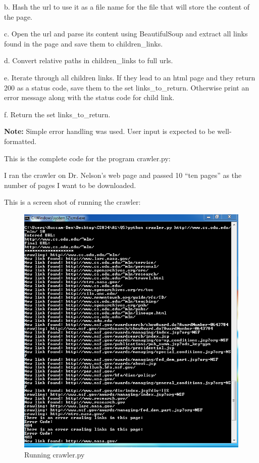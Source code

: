 \documentclass[a4paper, 11pt]{article}
\begin{document}
b. Hash the url to use it as a file name for the file that will store the content of the page.

c. Open the url and parse its content using BeautifulSoup and extract all links found in the page and save them to children\_links.

d. Convert relative paths in children\_links to full urls.

e. Iterate through all children links. If they lead to an html page and they return 200 as a status code, save them to the set links\_to\_return. Otherwise print an error message along with the status code for child link.

f. Return the set links\_to\_return.

\textbf{Note:} Simple error handling was used. User input is expected to be well-formatted.

This is the complete code for the program crawler.py:




I ran the crawler on Dr. Nelson's web page and passed 10 ``ten pages'' as the number of pages I want to be downloaded.

This is a screen shot of running the crawler:

\begin{figure}[h]
\caption{Running crawler.py}
\centering
\includegraphics[scale=0.7]{Q5/crawler.png}
\end{figure}
\end{document}
